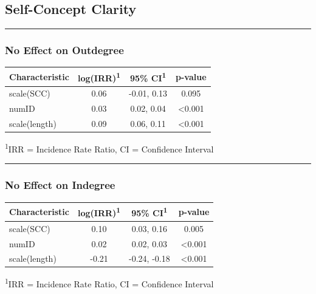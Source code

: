\documentclass[
  .7em,
  letterpaper,
  DIV=11,
  numbers=noendperiod]{scrartcl}
\begin{document}
\hypertarget{self-concept-clarity}{%
\subsection{Self-Concept Clarity}\label{self-concept-clarity}}

\begin{center}\rule{0.5\linewidth}{0.5pt}\end{center}

\hypertarget{no-effect-on-outdegree-1}{%
\subsubsection{No Effect on Outdegree}\label{no-effect-on-outdegree-1}}

\captionsetup[table]{labelformat=empty,skip=1pt}
\setlength{\LTpost}{0mm}
\begin{longtable}{lccc}
\toprule
\textbf{Characteristic} & \textbf{log(IRR)}\textsuperscript{1} & \textbf{95\% CI}\textsuperscript{1} & \textbf{p-value} \\ 
\midrule
scale(SCC) & 0.06 & -0.01, 0.13 & 0.095 \\ 
numID & 0.03 & 0.02, 0.04 & <0.001 \\ 
scale(length) & 0.09 & 0.06, 0.11 & <0.001 \\ 
\bottomrule
\end{longtable}
\begin{minipage}{\linewidth}
\textsuperscript{1}IRR = Incidence Rate Ratio, CI = Confidence Interval\\
\end{minipage}

\begin{center}\rule{0.5\linewidth}{0.5pt}\end{center}

\hypertarget{no-effect-on-indegree-1}{%
\subsubsection{No Effect on Indegree}\label{no-effect-on-indegree-1}}

\captionsetup[table]{labelformat=empty,skip=1pt}
\setlength{\LTpost}{0mm}
\begin{longtable}{lccc}
\toprule
\textbf{Characteristic} & \textbf{log(IRR)}\textsuperscript{1} & \textbf{95\% CI}\textsuperscript{1} & \textbf{p-value} \\ 
\midrule
scale(SCC) & 0.10 & 0.03, 0.16 & 0.005 \\ 
numID & 0.02 & 0.02, 0.03 & <0.001 \\ 
scale(length) & -0.21 & -0.24, -0.18 & <0.001 \\ 
\bottomrule
\end{longtable}
\begin{minipage}{\linewidth}
\textsuperscript{1}IRR = Incidence Rate Ratio, CI = Confidence Interval\\
\end{minipage}
\end{document}

